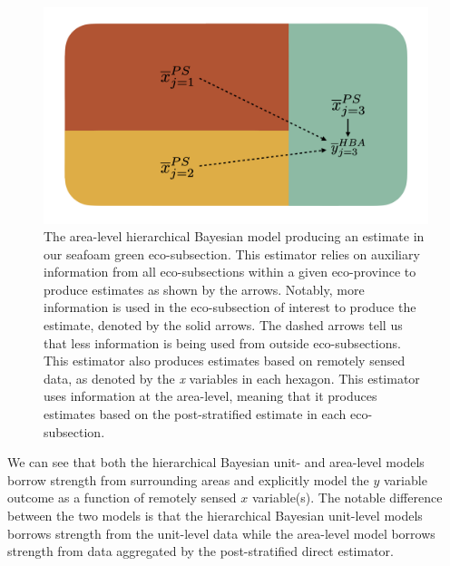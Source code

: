 \documentclass[12pt,twoside]{reedthesis}
\begin{document}
\begin{figure}

{\centering \includegraphics[width=1\linewidth]{figure/hba-diagram} 

}

\caption[The area-level hierarchical Bayesian model]{The area-level hierarchical Bayesian model producing an estimate in our seafoam green eco-subsection. This estimator relies on auxiliary information from all eco-subsections within a given eco-province to produce estimates as shown by the arrows. Notably, more information is used in the eco-subsection of interest to produce the estimate, denoted by the solid arrows. The dashed arrows tell us that less information is being used from outside eco-subsections. This estimator also produces estimates based on remotely sensed data, as denoted by the \textit{x} variables in each hexagon. This estimator uses information at the area-level, meaning that it produces estimates based on the post-stratified estimate in each eco-subsection.}\label{fig:hba-diagram}
\end{figure}
We can see that both the hierarchical Bayesian unit- and area-level models borrow strength from surrounding areas and explicitly model the \(y\) variable outcome as a function of remotely sensed \(x\) variable(s). The notable difference between the two models is that the hierarchical Bayesian unit-level models borrows strength from the unit-level data while the area-level model borrows strength from data aggregated by the post-stratified direct estimator.
\end{document}
